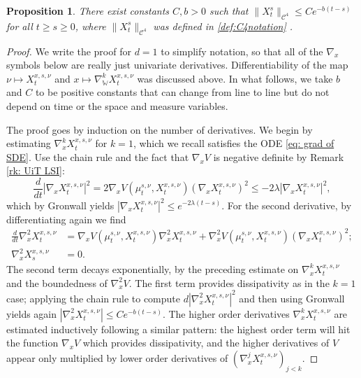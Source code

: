 \documentclass[11pt,reqno]{amsart}
\numberwithin{equation}{section}
\newtheorem{proposition}[theorem]{Proposition}
\theoremstyle{definition}
\newcommand{\wgrad}{\nabla_{\W}}
\newcommand{\W}{\mathbb W}
\begin{document}
\begin{proposition}
\label{pr: decay of wgrad X}
    There exist constants $C,b>0$ such that
    $\|X_t^s\|_{\mathcal C^4}\leq Ce^{-b(t-s)}$ for all $t \ge s \ge 0$, where $\|X_t^s\|_{\mathcal C^4}$ was defined in \eqref{def:C4notation} .
\end{proposition}
\begin{proof}
We write the proof for $d=1$ to simplify notation, so that all of the $\nabla_x$ symbols below are really just univariate derivatives. Differentiability of the map $\nu\mapsto X_t^{x,s,\nu}$ and $x\mapsto \wgrad^{k} X_t^{x,s,\nu}$ was discussed above.
In what follows, we take $b$ and $C$ to be positive constants that can change from line to line but do not depend on time or the space and measure variables.

The proof goes by induction on the number of derivatives. We begin by estimating $\nabla_x^k X_t^{x,s,\nu}$ for $k=1$, which we recall satisfies the ODE \eqref{eq: grad of SDE}. Use the chain rule and the fact that $\nabla_x V$ is negative definite by Remark \ref{rk: UiT LSI}:
    \[\frac{d}{dt}|\nabla_x X_t^{x,s,\nu}|^2= 2  \nabla_x V (\mu_t^{s,\nu},X_t^{x,s,\nu}) (\nabla_x X_t^{x,s,\nu})^2 \leq -2\lambda |\nabla_x X_t^{x,s,\nu}|^2 ,\]
    which by Gronwall yields $|\nabla_x X_t^{x,s,\nu}|^2\leq e^{-2\lambda(t-s) }$. For the second derivative, by differentiating again we find 
    \begin{align*}
    \frac{d}{dt}\nabla_x^2 X_t^{x,s,\nu}&= \nabla_x V(\mu_t^{s,\nu},X_t^{x,s,\nu})\nabla_x^{2}X_t^{x,s,\nu} +\nabla^2_xV(\mu_t^{s,\nu},X_t^{x,s,\nu})(\nabla_x X_t^{x,s,\nu})^2 ;\\
    \nabla_x^2 X_s^{x,s,\nu}&=0.
    \end{align*}
    The second term decays exponentially, by the preceding estimate on $\nabla_x^k X_t^{x,s,\nu}$ and the boundedness of  $\nabla_x^2V$. The first term provides dissipativity as in the $k=1$ case; applying the chain rule to compute $d|\nabla_x^2 X_t^{x,s,\nu}|^2$ and then using Gronwall yields again $|\nabla_x^2 X_t^{x,s,\nu}|\leq Ce^{-b(t-s)}$.
    The higher order derivatives $\nabla_x^k X_t^{x,s,\nu}$ are estimated inductively following a similar pattern: the highest order term will hit the function $\nabla_x V$ which provides dissipativity, and the higher derivatives of $V$ appear only multiplied by lower order derivatives of $(\nabla_x^j X_t^{x,s,\nu})_{j < k}$.
    

\end{proof}
\end{document}
